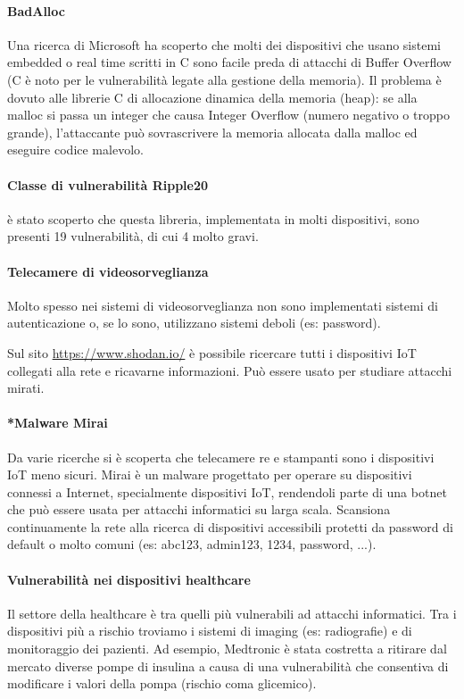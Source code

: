 \paragraph{BadAlloc} Una ricerca di Microsoft ha scoperto che molti dei dispositivi che usano sistemi embedded o real time scritti in C sono facile preda di attacchi di Buffer Overflow (C è noto per le vulnerabilità legate alla gestione della memoria). Il problema è dovuto alle librerie C di allocazione dinamica della memoria (heap): se alla malloc si passa un integer che causa Integer Overflow (numero negativo o troppo grande), l'attaccante può sovrascrivere la memoria allocata dalla malloc ed eseguire codice malevolo.

\paragraph{Classe di vulnerabilità Ripple20} è stato scoperto che questa libreria, implementata in molti dispositivi, sono presenti 19 vulnerabilità, di cui 4 molto gravi.

\paragraph{Telecamere di videosorveglianza} Molto spesso nei sistemi di videosorveglianza non sono implementati sistemi di autenticazione o, se lo sono, utilizzano sistemi deboli (es: password).

Sul sito \href{https://www.shodan.io/}{https://www.shodan.io/} è possibile ricercare tutti i dispositivi IoT collegati alla rete e ricavarne informazioni. Può essere usato per studiare attacchi mirati.

\paragraph{*Malware Mirai} Da varie ricerche si è scoperta che telecamere re e stampanti sono i dispositivi IoT meno sicuri. Mirai è un malware progettato per operare su dispositivi connessi a Internet, specialmente dispositivi IoT, rendendoli parte di una botnet che può essere usata per attacchi informatici su larga scala. Scansiona continuamente la rete alla ricerca di dispositivi accessibili protetti da password di default o molto comuni (es: abc123, admin123, 1234, password, ...).

\paragraph{Vulnerabilità nei dispositivi healthcare} Il settore della healthcare è tra quelli più vulnerabili ad attacchi informatici. Tra i dispositivi più a rischio troviamo i sistemi di imaging (es: radiografie) e di monitoraggio dei pazienti. Ad esempio, Medtronic è stata costretta a ritirare dal mercato diverse pompe di insulina a causa di una vulnerabilità che consentiva di modificare i valori della pompa (rischio coma glicemico).

